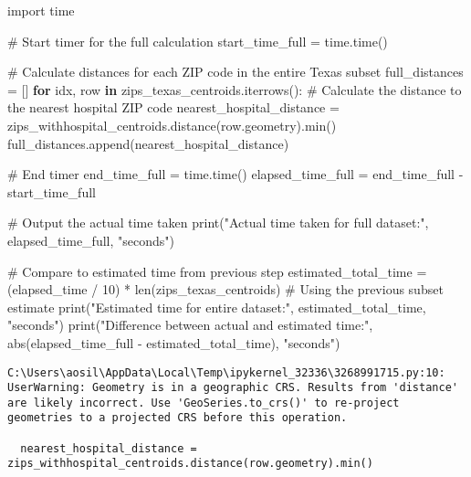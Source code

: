 \documentclass[
  letterpaper,
  DIV=11,
  numbers=noendperiod]{scrartcl}
\newenvironment{Shaded}{\begin{snugshade}}{\end{snugshade}}
\newcommand{\BuiltInTok}[1]{\textcolor[rgb]{0.00,0.23,0.31}{#1}}
\newcommand{\CommentTok}[1]{\textcolor[rgb]{0.37,0.37,0.37}{#1}}
\newcommand{\ControlFlowTok}[1]{\textcolor[rgb]{0.00,0.23,0.31}{\textbf{#1}}}
\newcommand{\DecValTok}[1]{\textcolor[rgb]{0.68,0.00,0.00}{#1}}
\newcommand{\ImportTok}[1]{\textcolor[rgb]{0.00,0.46,0.62}{#1}}
\newcommand{\KeywordTok}[1]{\textcolor[rgb]{0.00,0.23,0.31}{\textbf{#1}}}
\newcommand{\NormalTok}[1]{\textcolor[rgb]{0.00,0.23,0.31}{#1}}
\newcommand{\OperatorTok}[1]{\textcolor[rgb]{0.37,0.37,0.37}{#1}}
\newcommand{\StringTok}[1]{\textcolor[rgb]{0.13,0.47,0.30}{#1}}
\begin{document}
\begin{Shaded}
\begin{Highlighting}[]
\ImportTok{import}\NormalTok{ time}

\CommentTok{\# Start timer for the full calculation}
\NormalTok{start\_time\_full }\OperatorTok{=}\NormalTok{ time.time()}

\CommentTok{\# Calculate distances for each ZIP code in the entire Texas subset}
\NormalTok{full\_distances }\OperatorTok{=}\NormalTok{ []}
\ControlFlowTok{for}\NormalTok{ idx, row }\KeywordTok{in}\NormalTok{ zips\_texas\_centroids.iterrows():}
    \CommentTok{\# Calculate the distance to the nearest hospital ZIP code}
\NormalTok{    nearest\_hospital\_distance }\OperatorTok{=}\NormalTok{ zips\_withhospital\_centroids.distance(row.geometry).}\BuiltInTok{min}\NormalTok{()}
\NormalTok{    full\_distances.append(nearest\_hospital\_distance)}

\CommentTok{\# End timer}
\NormalTok{end\_time\_full }\OperatorTok{=}\NormalTok{ time.time()}
\NormalTok{elapsed\_time\_full }\OperatorTok{=}\NormalTok{ end\_time\_full }\OperatorTok{{-}}\NormalTok{ start\_time\_full}

\CommentTok{\# Output the actual time taken}
\BuiltInTok{print}\NormalTok{(}\StringTok{"Actual time taken for full dataset:"}\NormalTok{, elapsed\_time\_full, }\StringTok{"seconds"}\NormalTok{)}

\CommentTok{\# Compare to estimated time from previous step}
\NormalTok{estimated\_total\_time }\OperatorTok{=}\NormalTok{ (elapsed\_time }\OperatorTok{/} \DecValTok{10}\NormalTok{) }\OperatorTok{*} \BuiltInTok{len}\NormalTok{(zips\_texas\_centroids)  }\CommentTok{\# Using the previous subset estimate}
\BuiltInTok{print}\NormalTok{(}\StringTok{"Estimated time for entire dataset:"}\NormalTok{, estimated\_total\_time, }\StringTok{"seconds"}\NormalTok{)}
\BuiltInTok{print}\NormalTok{(}\StringTok{"Difference between actual and estimated time:"}\NormalTok{, }\BuiltInTok{abs}\NormalTok{(elapsed\_time\_full }\OperatorTok{{-}}\NormalTok{ estimated\_total\_time), }\StringTok{"seconds"}\NormalTok{)}
\end{Highlighting}
\end{Shaded}

\begin{verbatim}
C:\Users\aosil\AppData\Local\Temp\ipykernel_32336\3268991715.py:10: UserWarning: Geometry is in a geographic CRS. Results from 'distance' are likely incorrect. Use 'GeoSeries.to_crs()' to re-project geometries to a projected CRS before this operation.

  nearest_hospital_distance = zips_withhospital_centroids.distance(row.geometry).min()
\end{verbatim}
\end{document}
